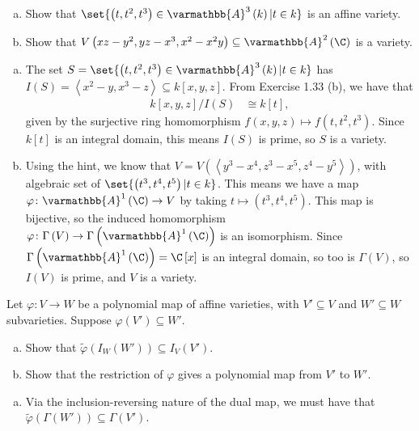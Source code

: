 \documentclass[10pt]{mypackage}
\renewcommand*{\mathbb}[1]{\varmathbb{#1}}
\newcommand{\A}{\mathbb{A}}
\begin{document}
\begin{exercise}[Exercise 2.8]\hfill
  \begin{enumerate}[(a)]
    \item Show that $\set{\left( t,t^2,t^3 \right)\in \A^3\left( k \right) | t\in k}$ is an affine variety.
    \item Show that $V\left( xz-y^2,yz-x^3,x^2-x^2y \right)\subseteq \A^2\left( \C \right)$ is a variety.
  \end{enumerate}
\end{exercise}
\begin{solution}\hfill
  \begin{enumerate}[(a)]
    \item The set $S = \set{\left( t,t^2,t^3 \right)\in \A^3\left( k \right) | t\in k}$ has $I(S) = \left\langle x^2 - y, x^3 - z \right\rangle\subseteq k\left[ x,y,z \right]$. From Exercise 1.33 (b), we have that
      \begin{align*}
        k\left[ x,y,z \right]/I(S) &\cong k\left[ t \right],
      \end{align*}
      given by the surjective ring homomorphism $f\left( x,y,z \right)\mapsto f\left( t,t^2,t^3 \right)$. Since $k\left[ t \right]$ is an integral domain, this means $I(S)$ is prime, so $S$ is a variety.
    \item Using the hint, we know that $V = V\left( \left\langle y^3-x^4,z^3-x^5,z^4-y^5 \right\rangle \right)$, with algebraic set of $\set{\left( t^3,t^4,t^5 \right) | t\in k}$. This means we have a map $\varphi\colon \A^1\left( \C \right)\rightarrow V$ by taking $t\mapsto \left( t^3,t^4,t^5 \right)$. This map is bijective, so the induced homomorphism $\varphi\colon \Gamma\left( V \right)\rightarrow \Gamma\left( \A^1\left( \C \right) \right)$ is an isomorphism. Since $\Gamma\left( \A^1\left( \C \right) \right) = \C\left[ x \right]$ is an integral domain, so too is $\Gamma\left( V \right)$, so $I(V)$ is prime, and $V$ is a variety.
  \end{enumerate}
\end{solution}
\begin{exercise}[Exercise 2.9]
  Let $\varphi\colon V\rightarrow W$ be a polynomial map of affine varieties, with $V'\subseteq V$ and $W'\subseteq W$ subvarieties. Suppose $\varphi\left( V' \right)\subseteq W'$.
  \begin{enumerate}[(a)]
    \item Show that $\widetilde{\varphi}\left( I_W\left( W' \right) \right) \subseteq I_V\left( V' \right)$.
    \item Show that the restriction of $\varphi$ gives a polynomial map from $V'$ to $W'$.
  \end{enumerate}
\end{exercise}
\begin{solution}\hfill
  \begin{enumerate}[(a)]
    \item Via the inclusion-reversing nature of the dual map, we must have that $\widetilde{\varphi}\left( \Gamma\left( W' \right) \right)\subseteq \Gamma\left( V' \right)$.
  \end{enumerate}
\end{solution}
\end{document}

